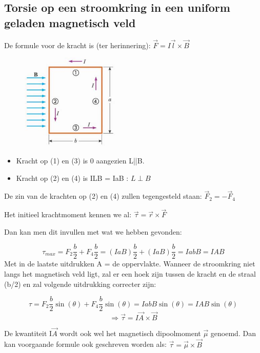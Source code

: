 \documentclass[12pt,a4paper]{article}
\begin{document}
	\subsection{Torsie op een stroomkring in een uniform geladen magnetisch veld}
	De formule voor de kracht is (ter herinnering): \(\vec{F} = I\vec{l}\times\vec{B}\)
	\begin{figure}[h]
		\centering
		\includegraphics[width=0.5\linewidth]{images/27.5.1}
	\end{figure}
	\newline
	\begin{itemize}
		\renewcommand\labelitemi{--}
		\item Kracht op (1) en (3) is 0 aangezien L||B.
		\item Kracht op (2) en (4) is ILB = IaB : \(L\perp B\)
	\end{itemize}

	De zin van de krachten op (2) en (4) zullen tegengesteld staan: \(\vec{F}_2 = -\vec{F}_4\)
	
	Het initieel krachtmoment kennen we al: \(\vec{\tau} = \vec{r}\times\vec{F}\)
	
	Dan kan men dit invullen met wat we hebben gevonden: 
	
	\[\tau_{max} = F_2\frac{b}{2} + F_4\frac{b}{2} = (IaB)\frac{b}{2} + (IaB)\frac{b}{2} = IabB = IAB\]
	Met in de laatste uitdrukken A = de oppervlakte. 
	\newline
	\newline
	Wanneer de stroomkring niet langs het magnetisch veld ligt, zal er een hoek zijn tussen de kracht en de straal (b/2) en zal volgende uitdrukking correcter zijn: 
	
	\[\tau = F_2\frac{b}{2}\sin(\theta) + F_4\frac{b}{2}\sin(\theta) = IabB\sin(\theta) = IAB\sin(\theta)\]
	\[\Rightarrow \vec{\tau} = I\vec{A}\times\vec{B}\]
	
	De kwantiteit I$\vec{A}$ wordt ook wel het magnetisch dipoolmoment $\vec{\mu}$ genoemd. Dan kan voorgaande formule ook geschreven worden als: 
	\(\vec{\tau} = \vec{\mu}\times\vec{B}\) 
	
\end{document}
